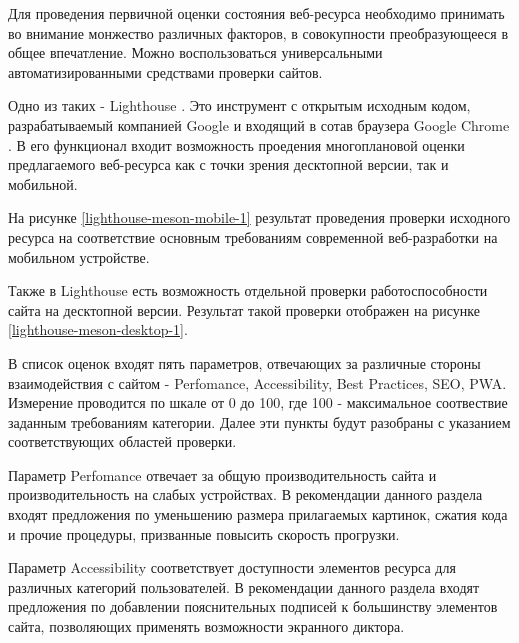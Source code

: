 Для проведения первичной оценки состояния веб-ресурса необходимо принимать во внимание монжество различных факторов, в совокупности преобразующееся в общее впечатление.
Можно воспользоваться универсальными автоматизированными средствами проверки сайтов.

Одно из таких - Lighthouse \cite{lighthouse}.
Это инструмент с открытым исходным кодом, разрабатываемый компанией Google \cite{google} и входящий в сотав браузера Google Chrome \cite{chrome}.
В его функционал входит возможность проедения многоплановой оценки предлагаемого веб-ресурса как с точки зрения десктопной версии, так и мобильной.

На рисунке \ref{lighthouse-meson-mobile-1} результат проведения проверки исходного ресурса на соответствие основным требованиям современной веб-разработки на мобильном устройстве.


Также в Lighthouse есть возможность отдельной проверки работоспособности сайта на десктопной версии.
Результат такой проверки отображен на рисунке \ref{lighthouse-meson-desktop-1}.


В список оценок входят пять параметров, отвечающих за различные стороны взаимодействия с сайтом - Perfomance, Accessibility, Best Practices, SEO, PWA.
Измерение проводится по шкале от 0 до 100, где 100 - максимальное соотвествие заданным требованиям категории.
Далее эти пункты будут разобраны с указанием соответствующих областей проверки.

Параметр Perfomance отвечает за общую производительность сайта и производительность на слабых устройствах.
В рекомендации данного раздела входят предложения по уменьшению размера прилагаемых картинок, сжатия кода и прочие процедуры, призванные повысить скорость прогрузки.

Параметр Accessibility соответствует доступности элементов ресурса для различных категорий пользователей.
В рекомендации данного раздела входят предложения по добавлении пояснительных подписей к большинству элементов сайта, позволяющих применять возможности экранного диктора.

